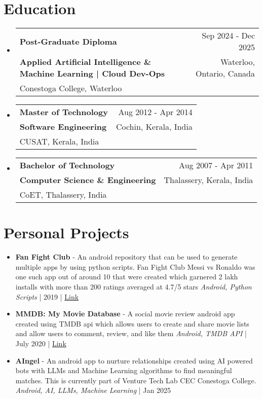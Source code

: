\documentclass[11pt,a4paper]{article}
\makeatletter
\newcommand{\resumeThreeLineSubheading}[6]{
  \vspace{-1pt}\item
    \begin{tabular*}{0.97\textwidth}[t]{l@{\extracolsep{\fill}}r}
      \textbf{#1} & \normalfont #2 \\  %
      \textbf{\normalfont #3} & \normalfont #4 \\  %
      \normalfont #5 & \normalfont #6 \\  %
    \end{tabular*}\vspace{-5pt}
}
\makeatother
\begin{document}
\section{Education}
\begin{itemize}[leftmargin=0.15in, label={}]
\resumeThreeLineSubheading
  {Post-Graduate Diploma}
  {Sep 2024 - Dec 2025}
  {Applied Artificial Intelligence \& Machine Learning | Cloud Dev-Ops}
  {Waterloo, Ontario, Canada}
  {Conestoga College, Waterloo}
  {}

\resumeThreeLineSubheading
  {Master of Technology}
  {Aug 2012 - Apr 2014}
  {Software Engineering}
  {Cochin, Kerala, India}
  {CUSAT, Kerala, India}
  {}

\resumeThreeLineSubheading
  {Bachelor of Technology}
  {Aug 2007 - Apr 2011}
  {Computer Science \& Engineering}
  {Thalassery, Kerala, India}
  {CoET, Thalassery, India}
  {}


\end{itemize}

\section{Personal Projects}
\begin{itemize}[leftmargin=0.15in, label={}]
    \item \textbf{Fan Fight Club} - An android repository that can be used to generate multiple apps by using python scripts. Fan Fight Club Messi vs Ronaldo was one such app out of around 10 that were created which garnered 2 lakh installs with more than 200 ratings averaged at 4.7/5 stars
          \textit{Android, Python Scripts} | 2019 | \href{https://bitbucket.org/nikhilshankarcs/fanfightclub}{Link}

    \item \textbf{MMDB: My Movie Database} - A social movie review android app created using TMDB api which allows users to create and share movie lists and allow users to comment, review, and like them
          \textit{Android, TMDB API} | July 2020 | \href{https://bitbucket.org/nikhilshankarcs/mmdb}{Link}

    \item \textbf{AIngel} - An android app to nurture relationships created using AI powered bots with LLMs and Machine Learning algorithms to find meaningful matches. This is currently part of Venture Tech Lab CEC Conestoga College.
          \textit{Android, AI, LLMs, Machine Learning} | Jan 2025


\end{itemize}
\end{document}
